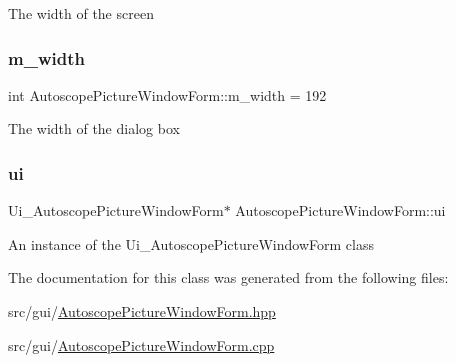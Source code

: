 The width of the screen \mbox{\label{class_autoscope_picture_window_form_aa5dacd6f9d13d4cafa98edae38d161f5}} 
\subsubsection{\texorpdfstring{m\_width}{m\_width}}
{\footnotesize\ttfamily int Autoscope\+Picture\+Window\+Form\+::m\+\_\+width = 192\hspace{0.3cm}{\ttfamily [private]}}

The width of the dialog box \mbox{\label{class_autoscope_picture_window_form_aac9815d1313c1814ff9f0eefa4eeb47d}} 
\subsubsection{\texorpdfstring{ui}{ui}}
{\footnotesize\ttfamily Ui\+\_\+\+Autoscope\+Picture\+Window\+Form$\ast$ Autoscope\+Picture\+Window\+Form\+::ui\hspace{0.3cm}{\ttfamily [private]}}

An instance of the Ui\+\_\+\+Autoscope\+Picture\+Window\+Form class 

The documentation for this class was generated from the following files\+:\begin{DoxyCompactItemize}
\item 
src/gui/\mbox{\hyperlink{_autoscope_picture_window_form_8hpp}{Autoscope\+Picture\+Window\+Form.\+hpp}}\item 
src/gui/\mbox{\hyperlink{_autoscope_picture_window_form_8cpp}{Autoscope\+Picture\+Window\+Form.\+cpp}}\end{DoxyCompactItemize}
